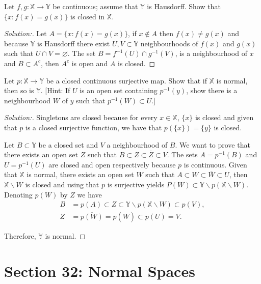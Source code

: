 \documentclass[a4paper,12pt, reqno]{article}
\theoremstyle{definition}
\newenvironment{exerr}[1]{
  \renewcommand\theexeralt{#1}
  \exeralt
}{\endexeralt}
\newenvironment{solution}{\begin{proof}[Solution:]}{\end{proof}}
\newcommand{\X}{\mathbb{X}}
\newcommand{\Y}{\mathbb{Y}}
\begin{document}
\begin{exerr}{5}
  Let $f,g:\X\to\Y$ be continuous; assume that $\Y$ is Hausdorff. Show that $\{ x : f(x) = g(x) \}$ is closed in $\X$.
\end{exerr}
\begin{solution}
  Let $A = \{ x : f(x) = g(x) \}$, if $x\notin A$ then $f(x) \neq g(x)$ and because $\Y$ is Hausdorff there exist $U,V\subset\Y$ neighbourhoods of $f(x)$ and $g(x)$ such that $U\cap V = \varnothing$. The set $B = f^{-1}(U)\cap g^{-1}(V)$, is a neighbourhood of $x$ and $B\subset A^c$, then $A^c$ is open and $A$ is closed.
\end{solution}

\begin{exerr}{6}
  Let $p:\X\to\Y$ be a closed continuous surjective map. Show that if $\X$ is normal, then so is $\Y$. [Hint: If $U$ is an open set containing $p^{-1}(y)$, show there is a neighbourhood $W$ of $y$ such that $p^{-1}(W)\subset U$.]
\end{exerr}
\begin{solution}
  Singletons are closed because for every $x\in\X$, $\{ x \}$ is closed and given that $p$ is a closed surjective function, we have that $p(\{ x \}) = \{ y \}$ is closed.

  Let $B\subset\Y$ be a closed set and $V$ a neighbourhood of $B$. We want to prove that there exists an open set $Z$ such that $B\subset Z\subset \overline{Z}\subset V$. The sets $A = p^{-1}(B)$ and $U = p^{-1}(U)$ are closed and open respectively because $p$ is continuous. Given that $\X$ is normal, there exists an open set $W$ such that $A\subset W\subset \overline{W}\subset U$, then $\X\backslash W$ is closed and using that $p$ is surjective yields $P(W)\subset \Y\backslash p(\X\backslash W)$. Denoting $p(W)$ by $Z$ we have
  \begin{align*}
    B &= p(A)\subset Z\subset\Y\backslash p(\X\backslash W)\subset p(V),\\
    \overline{Z} &= \overline{p(W)} = p(\overline{W})\subset p(U) = V.
  \end{align*}

  Therefore, $\Y$ is normal.
\end{solution}

\section*{Section 32: Normal Spaces}
\end{document}
